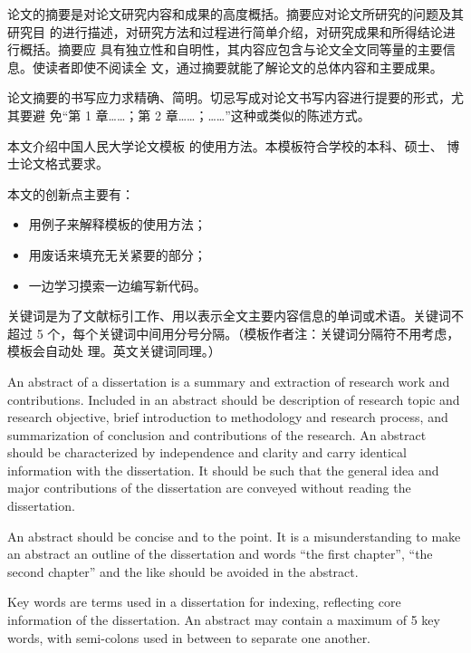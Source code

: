 \begin{cabstract}
  论文的摘要是对论文研究内容和成果的高度概括。摘要应对论文所研究的问题及其研究目
  的进行描述，对研究方法和过程进行简单介绍，对研究成果和所得结论进行概括。摘要应
  具有独立性和自明性，其内容应包含与论文全文同等量的主要信息。使读者即使不阅读全
  文，通过摘要就能了解论文的总体内容和主要成果。

  论文摘要的书写应力求精确、简明。切忌写成对论文书写内容进行提要的形式，尤其要避
  免“第 1 章……；第 2 章……；……”这种或类似的陈述方式。

  本文介绍中国人民大学论文模板 \ructhesis{} 的使用方法。本模板符合学校的本科、硕士、
  博士论文格式要求。

  本文的创新点主要有：
  \begin{itemize}
    \item 用例子来解释模板的使用方法；
    \item 用废话来填充无关紧要的部分；
    \item 一边学习摸索一边编写新代码。
  \end{itemize}

  关键词是为了文献标引工作、用以表示全文主要内容信息的单词或术语。关键词不超过 5
  个，每个关键词中间用分号分隔。（模板作者注：关键词分隔符不用考虑，模板会自动处
  理。英文关键词同理。）
\end{cabstract}


\begin{eabstract}
   An abstract of a dissertation is a summary and extraction of research work
   and contributions. Included in an abstract should be description of research
   topic and research objective, brief introduction to methodology and research
   process, and summarization of conclusion and contributions of the
   research. An abstract should be characterized by independence and clarity and
   carry identical information with the dissertation. It should be such that the
   general idea and major contributions of the dissertation are conveyed without
   reading the dissertation.

   An abstract should be concise and to the point. It is a misunderstanding to
   make an abstract an outline of the dissertation and words ``the first
   chapter'', ``the second chapter'' and the like should be avoided in the
   abstract.

   Key words are terms used in a dissertation for indexing, reflecting core
   information of the dissertation. An abstract may contain a maximum of 5 key
   words, with semi-colons used in between to separate one another.
\end{eabstract}


